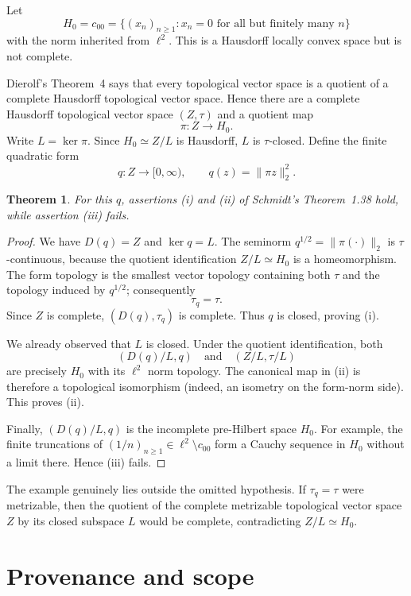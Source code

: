 \documentclass[11pt]{article}
\newtheorem{theorem}{Theorem}
\begin{document}
Let
\[
H_0=c_{00}=\{(x_n)_{n\geq1}:x_n=0\text{ for all but finitely many }n\}
\]
with the norm inherited from $\ell^2$. This is a Hausdorff locally convex space but is not complete.

Dierolf's Theorem~4 \cite[p.~76]{Dierolf} says that every topological vector space is a quotient of a complete Hausdorff topological vector space. Hence there are a complete Hausdorff topological vector space $(Z,\tau)$ and a quotient map
\[
\pi:Z\longrightarrow H_0.
\]
Write $L=\ker\pi$. Since $H_0\simeq Z/L$ is Hausdorff, $L$ is $\tau$-closed. Define the finite quadratic form
\[
q:Z\longrightarrow[0,\infty),\qquad q(z)=\|\pi z\|_2^2.
\]

\begin{theorem}
For this $q$, assertions \emph{(i)} and \emph{(ii)} of Schmidt's Theorem~1.38 hold, while assertion \emph{(iii)} fails.
\end{theorem}

\begin{proof}
We have $D(q)=Z$ and $\ker q=L$. The seminorm $q^{1/2}=\|\pi(\cdot)\|_2$ is $\tau$-continuous, because the quotient identification $Z/L\simeq H_0$ is a homeomorphism. The form topology is the smallest vector topology containing both $\tau$ and the topology induced by $q^{1/2}$; consequently
\[
\tau_q=\tau.
\]
Since $Z$ is complete, $(D(q),\tau_q)$ is complete. Thus $q$ is closed, proving (i).

We already observed that $L$ is closed. Under the quotient identification, both
\[
(D(q)/L,q)\quad\text{and}\quad(Z/L,\tau/L)
\]
are precisely $H_0$ with its $\ell^2$ norm topology. The canonical map in (ii) is therefore a topological isomorphism (indeed, an isometry on the form-norm side). This proves (ii).

Finally, $(D(q)/L,q)$ is the incomplete pre-Hilbert space $H_0$. For example, the finite truncations of $(1/n)_{n\geq1}\in\ell^2\setminus c_{00}$ form a Cauchy sequence in $H_0$ without a limit there. Hence (iii) fails.
\end{proof}

The example genuinely lies outside the omitted hypothesis. If $\tau_q=\tau$ were metrizable, then the quotient of the complete metrizable topological vector space $Z$ by its closed subspace $L$ would be complete, contradicting $Z/L\simeq H_0$.

\section{Provenance and scope}
\end{document}
